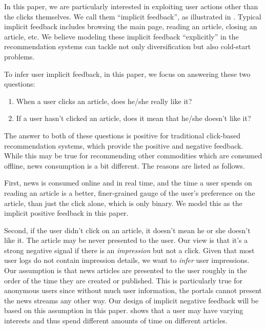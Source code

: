 In this paper, we are particularly interested in exploiting user actions
other than the clicks themselves. We call them ``implicit feedback'', as
illustrated in . 
Typical implicit feedback includes browsing the main page, 
reading an article, closing an article, etc. We believe modeling
these implicit feedback ``explicitly'' in the recommendation systems
can tackle not only diversification but also cold-start problems.
  
To infer user implicit feedback, in this paper, we focus on answering 
these two questions:
\begin{enumerate}[label=(\roman*)]
\item When a user clicks an article, does he/she really like it? 
\item If a user hasn't clicked an article, does it mean that he/she doesn't 
like it?
\end{enumerate}
The answer to both of these questions is positive for traditional click-based
recommendation systems, which provide the positive and negative feedback. While this may be true for recommending other 
commodities which are consumed offline, news consumption is a bit 
different. The reasons are listed as follows.

First, news is consumed online and in real time, and the time a user spends
on reading an article is a better, finer-grained gauge of the user's 
preference on the article, than just the click alone, which is only
binary. We model this as the implicit positive feedback in this paper.

Second, if the user didn't click on an article, it doesn't mean
he or she doesn't like it. The article may be never presented to the user.
Our view is that it's a strong negative signal if there is 
an \textit{impression} but not a click. Given that most user logs do not 
contain impression details, we want to \textit{infer} user impressions.
Our assumption is that news articles are presented to the user roughly
in the order of the time they are created or published. 
This is particularly true for anonymous users since without much user information,
the portals cannot present the news streams any other way. Our design of implicit
negative feedback will be based on this assumption in this paper. 
 shows that a user may have varying interests and thus
spend different amounts of time on different articles.

